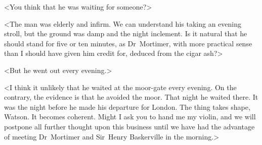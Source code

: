 <You think that he was waiting for someone?>

<The man was elderly and infirm. We can understand his taking an evening stroll, but the ground was damp and the night inclement. Is it natural that he should stand for five or ten minutes, as Dr~Mortimer, with more practical sense than I should have given him credit for, deduced from the cigar ash?>

<But he went out every evening.>

<I think it unlikely that he waited at the moor-gate every evening. On the contrary, the evidence is that he avoided the moor. That night he waited there. It was the night before he made his departure for London. The thing takes shape, Watson. It becomes coherent. Might I ask you to hand me my violin, and we will postpone all further thought upon this business until we have had the advantage of meeting Dr~Mortimer and Sir~Henry Baskerville in the morning.>

